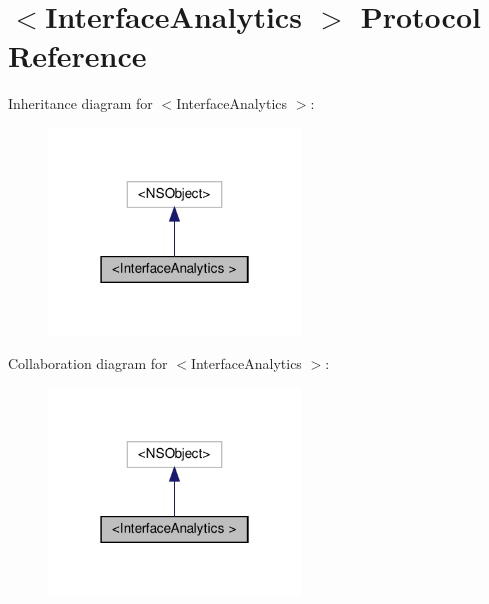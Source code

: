 \hypertarget{protocolInterfaceAnalytics_01-p}{}\section{$<$Interface\+Analytics $>$ Protocol Reference}
\label{protocolInterfaceAnalytics_01-p}


Inheritance diagram for $<$Interface\+Analytics $>$\+:
\nopagebreak
\begin{figure}[H]
\begin{center}
\leavevmode
\includegraphics[width=190pt]{protocolInterfaceAnalytics_01-p__inherit__graph}
\end{center}
\end{figure}


Collaboration diagram for $<$Interface\+Analytics $>$\+:
\nopagebreak
\begin{figure}[H]
\begin{center}
\leavevmode
\includegraphics[width=190pt]{protocolInterfaceAnalytics_01-p__coll__graph}
\end{center}
\end{figure}
